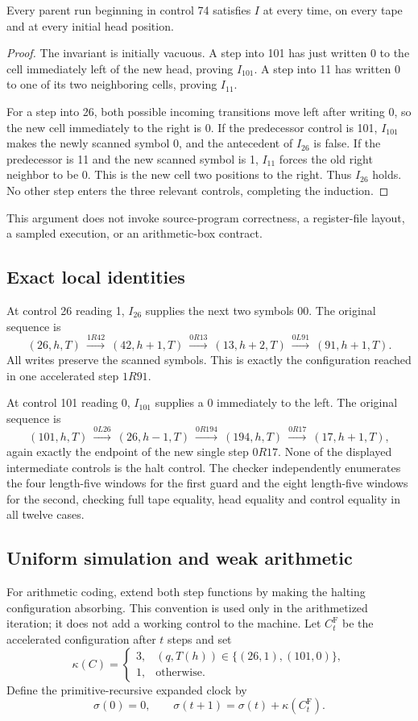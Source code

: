 \begin{lemma}
Every parent run beginning in control 74 satisfies $I$ at every time,
on every tape and at every initial head position.
\end{lemma}
\begin{proof}
The invariant is initially vacuous. A step into 101 has just written 0 to
the cell immediately left of the new head, proving $I_{101}$. A step into 11
has written 0 to one of its two neighboring cells, proving $I_{11}$.

For a step into 26, both possible incoming transitions move left after
writing 0, so the new cell immediately to the right is 0. If the predecessor
control is 101, $I_{101}$ makes the newly scanned symbol 0, and the antecedent
of $I_{26}$ is false. If the predecessor is 11 and the new scanned symbol is 1,
$I_{11}$ forces the old right neighbor to be 0. This is the new cell two
positions to the right. Thus $I_{26}$ holds. No other step enters the three
relevant controls, completing the induction.
\end{proof}

This argument does not invoke source-program correctness, a register-file
layout, a sampled execution, or an arithmetic-box contract.

\subsection{Exact local identities}
At control 26 reading 1, $I_{26}$ supplies the next two symbols $00$.
The original sequence is
\[
 (26,h,T)\ \xrightarrow{1R42}\ (42,h+1,T)
 \ \xrightarrow{0R13}\ (13,h+2,T)
 \ \xrightarrow{0L91}\ (91,h+1,T).
\]
All writes preserve the scanned symbols. This is exactly the configuration
reached in one accelerated step $1R91$.

At control 101 reading 0, $I_{101}$ supplies a 0 immediately to the left.
The original sequence is
\[
 (101,h,T)\ \xrightarrow{0L26}\ (26,h-1,T)
 \ \xrightarrow{0R194}\ (194,h,T)
 \ \xrightarrow{0R17}\ (17,h+1,T),
\]
again exactly the endpoint of the new single step $0R17$.
None of the displayed intermediate controls is the halt control.
The checker independently enumerates the four length-five windows for the
first guard and the eight length-five windows for the second, checking full
tape equality, head equality and control equality in all twelve cases.

\subsection{Uniform simulation and weak arithmetic}
For arithmetic coding, extend both step functions by making the halting
configuration absorbing. This convention is used only in the arithmetized
iteration; it does not add a working control to the machine.
Let $C_t^{\mathrm F}$ be the accelerated configuration after $t$ steps and set
\[
 \kappa(C)=\begin{cases}
 3,&(q,T(h))\in\{(26,1),(101,0)\},\\
 1,&\text{otherwise}.
 \end{cases}
\]
Define the primitive-recursive expanded clock by
\[
 \sigma(0)=0,\qquad
 \sigma(t+1)=\sigma(t)+\kappa(C_t^{\mathrm F}).
\]


